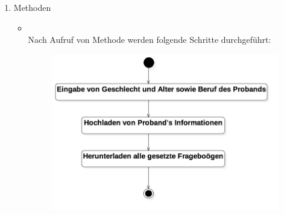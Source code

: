 \documentclass[a4paper]{scrreprt}
\begin{document}
{\begin{enumerate}
                        \item Methoden
                            \begin{itemize}
                                \item {\large {}}\\
                                    Nach Aufruf von Methode  werden folgende Schritte durchgeführt:
                                    \begin{figure}[H]
                                        \centering
                                        \includegraphics[scale = 0.5]{logIn.jpg}
                                        \caption{}
                                    \end{figure}


\end{itemize}
\end{enumerate}}
\end{document}
